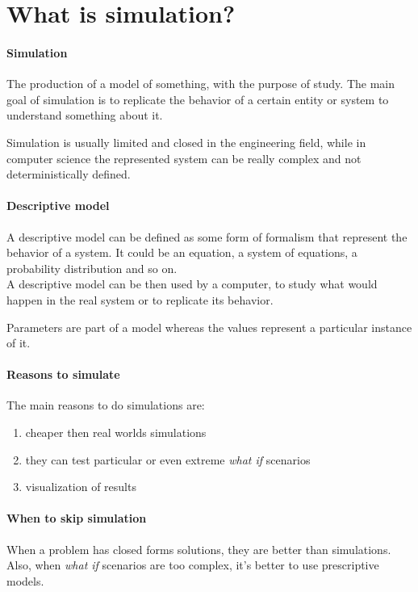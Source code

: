 \section{What is simulation?}
\paragraph{Simulation}
The production of a model of something, with the purpose 
of study. The main goal of simulation is to replicate the behavior of a certain 
entity or system to understand something about it.

Simulation is usually limited and closed in the engineering field, while 
in computer science the represented system can be really complex and
not deterministically defined.

\paragraph{Descriptive model}
A descriptive model can be defined as some form of formalism that represent 
the behavior of a system.
It could be an equation, a system of equations, a probability distribution 
and so on.\\
A descriptive model can be then used by a computer, to study what would happen 
in the real system or to replicate its behavior.

\begin{remark}
    Parameters are part of a model whereas the values represent a particular 
    instance of it.
\end{remark}

\paragraph{Reasons to simulate}
The main reasons to do simulations are:
\begin{enumerate}
    \item cheaper then real worlds simulations
    \item they can test particular or even extreme \emph{what if} scenarios
    \item visualization of results
\end{enumerate}

\paragraph{When to skip simulation}
When a problem has closed forms solutions, they 
are better than simulations.
Also, when \emph{what if} scenarios are too complex, it's better to use 
prescriptive models.

